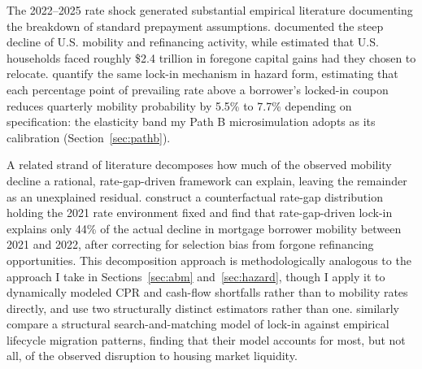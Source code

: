 \documentclass[12pt]{article}
\begin{document}
The 2022--2025 rate shock generated substantial empirical literature documenting the breakdown of standard prepayment assumptions. \citet{fonseca2024} documented the steep decline of U.S. mobility and refinancing activity, while \citet{batzer2024} estimated that U.S. households faced roughly \$2.4 trillion in foregone capital gains had they chosen to relocate. \citet{liebersohn2024} quantify the same lock-in mechanism in hazard form, estimating that each percentage point of prevailing rate above a borrower's locked-in coupon reduces quarterly mobility probability by 5.5\% to 7.7\% depending on specification: the elasticity band my Path B microsimulation adopts as its calibration (Section~\ref{sec:pathb}).

A related strand of literature decomposes how much of the observed mobility decline a rational, rate-gap-driven framework can explain, leaving the remainder as an unexplained residual. \citet{aladangady2024} construct a counterfactual rate-gap distribution holding the 2021 rate environment fixed and find that rate-gap-driven lock-in explains only 44\% of the actual decline in mortgage borrower mobility between 2021 and 2022, after correcting for selection bias from forgone refinancing opportunities. This decomposition approach is methodologically analogous to the approach I take in Sections~\ref{sec:abm} and~\ref{sec:hazard}, though I apply it to dynamically modeled CPR and cash-flow shortfalls rather than to mobility rates directly, and use two structurally distinct estimators rather than one. \citet{gerardi2024} similarly compare a structural search-and-matching model of lock-in against empirical lifecycle migration patterns, finding that their model accounts for most, but not all, of the observed disruption to housing market liquidity.
\end{document}
